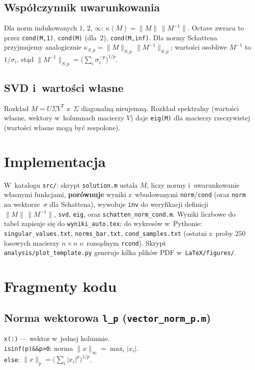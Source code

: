 \documentclass[polish]{template/projectreport}
\begin{document}
\subsection{Współczynnik uwarunkowania}
Dla norm indukowanych $1$, $2$, $\infty$: $\kappa(M) = \|M\|\,\|M^{-1}\|$. Octave zwraca to przez \texttt{cond(M,1)}, \texttt{cond(M)} (dla~$2$), \texttt{cond(M,inf)}. Dla normy Schattena przyjmujemy analogicznie $\kappa_{S,p} = \|M\|_{S,p}\,\|M^{-1}\|_{S,p}$; wartości osobliwe $M^{-1}$ to $1/\sigma_i$, stąd $\|M^{-1}\|_{S,p} = \bigl(\sum_i \sigma_i^{-p}\bigr)^{1/p}$.

\subsection{SVD i~wartości własne}
Rozkład $M = U \Sigma V^{\mathsf T}$ z~$\Sigma$ diagonalną nieujemną. Rozkład spektralny (wartości własne, wektory w~kolumnach macierzy $V$) daje \texttt{eig(M)} dla macierzy rzeczywistej (wartości własne mogą być zespolone).

\section{Implementacja}
W~katalogu \texttt{src/}: skrypt \texttt{solution.m} ustala $M$, liczy normy i~uwarunkowanie własnymi funkcjami, \textbf{porównuje} wyniki z~wbudowanymi \texttt{norm}/\texttt{cond} (oraz \texttt{norm} na wektorze~$\sigma$ dla Schattena), wywołuje \texttt{inv} do weryfikacji definicji $\|M\|\,\|M^{-1}\|$, \texttt{svd}, \texttt{eig}, oraz \texttt{schatten\_norm\_cond.m}. Wyniki liczbowe do tabel zapisuje się do \texttt{wyniki\_auto.tex}; do wykresów w~Pythonie: \texttt{singular\_values.txt}, \texttt{norms\_bar.txt}, \texttt{cond\_samples.txt} (ostatni z~proby $250$ losowych macierzy $n\times n$ o~rozsądnym \texttt{rcond}). Skrypt \texttt{analysis/plot\_template.py} generuje kilka plików PDF w~\texttt{LaTeX/figures/}.

\section{Fragmenty kodu}

\subsection{Norma wektorowa \texttt{l\_p} (\texttt{vector\_norm\_p.m})}


\noindent\texttt{x(:)} --- wektor w~jednej kolumnie.\\
\texttt{isinf(p)\&\&p>0}: norma $\|x\|_\infty=\max_i|x_i|$.\\
\texttt{else}: $\|x\|_p=\bigl(\sum_i|x_i|^p\bigr)^{1/p}$.\\
\end{document}
